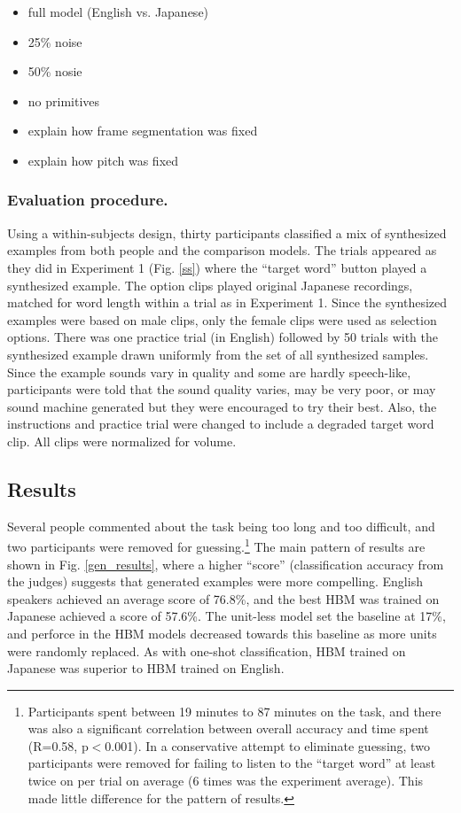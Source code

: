 \documentclass[10pt,letterpaper]{article}
\begin{document}
\begin{itemize}
\item full model (English vs. Japanese)
\item 25\% noise
\item 50\% nosie
\item no primitives
\item explain how frame segmentation was fixed
\item explain how pitch was fixed
\end{itemize}

\subsubsection{Evaluation procedure.}
Using a within-subjects design, thirty participants classified a mix of synthesized examples from both people and the comparison models. The trials appeared as they did in Experiment 1 (Fig. \ref{ss}) where the ``target word'' button played a synthesized example. The option clips played original Japanese recordings, matched for word length within a trial as in Experiment 1. Since the synthesized examples were based on male clips, only the female clips were used as selection options. There was one practice trial (in English) followed by 50 trials with the synthesized example drawn uniformly from the set of all synthesized samples. Since the example sounds vary in quality and some are hardly speech-like, participants were told that the sound quality varies, may be very poor, or may sound machine generated but they were encouraged to try their best. Also, the instructions and practice trial were changed to include a degraded target word clip. All clips were normalized for volume.

\subsection{Results}
Several people commented about the task being too long and too difficult, and two participants were removed for guessing.\footnote{Participants spent between 19 minutes to 87 minutes on the task, and there was also a significant correlation between overall accuracy and time spent (R=0.58, p$<$0.001). In a conservative attempt to eliminate guessing, two participants were removed for failing to listen to the ``target word'' at least twice on per trial on average (6 times was the experiment average). This made little difference for the pattern of results.} The main pattern of results are shown in Fig. \ref{gen_results}, where a higher ``score'' (classification accuracy from the judges)  suggests that generated examples were more compelling. English speakers achieved an average score of 76.8\%, and the best HBM was trained on Japanese achieved a score of 57.6\%. The unit-less model set the baseline at 17\%, and perforce in the HBM models decreased towards this baseline as more units were randomly replaced. As with one-shot classification, HBM trained on Japanese was superior to HBM trained on English. 
\end{document}

